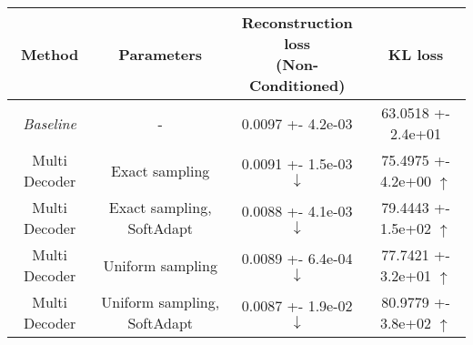 \centering
\scriptsize
\begin{tabular}{||c|c|c|c||}
\hline
 Method & Parameters & \shortstack{Reconstruction loss \\  (Non-Conditioned)} & KL loss \\
\hline
\textit{Baseline} & - & 0.0097 +- 4.2e-03 & 63.0518 +- 2.4e+01 \\
\hline
Multi Decoder & Exact sampling & 0.0091 +- 1.5e-03  $\downarrow$ & 75.4975 +- 4.2e+00  $\uparrow$ \\
\hline
Multi Decoder & Exact sampling, SoftAdapt & 0.0088 +- 4.1e-03  $\downarrow$ & 79.4443 +- 1.5e+02  $\uparrow$ \\
\hline
Multi Decoder & Uniform sampling & 0.0089 +- 6.4e-04  $\downarrow$ & 77.7421 +- 3.2e+01  $\uparrow$ \\
\hline
Multi Decoder & Uniform sampling, SoftAdapt & 0.0087 +- 1.9e-02  $\downarrow$ & 80.9779 +- 3.8e+02  $\uparrow$ \\
\hline
\end{tabular}
